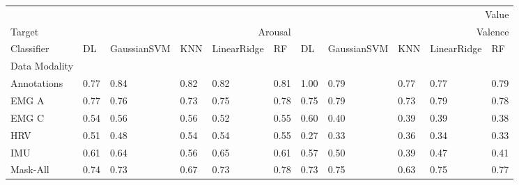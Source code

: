 \begin{tabular}{lllllllllll}
 & \multicolumn{10}{r}{Value} \\
Target & \multicolumn{5}{r}{Arousal} & \multicolumn{5}{r}{Valence} \\
Classifier & DL & GaussianSVM & KNN & LinearRidge & RF & DL & GaussianSVM & KNN & LinearRidge & RF \\
Data Modality &  &  &  &  &  &  &  &  &  &  \\
Annotations & 0.77 & 0.84 & 0.82 & 0.82 & 0.81 & 1.00 & 0.79 & 0.77 & 0.77 & 0.79 \\
EMG A & 0.77 & 0.76 & 0.73 & 0.75 & 0.78 & 0.75 & 0.79 & 0.73 & 0.79 & 0.78 \\
EMG C & 0.54 & 0.56 & 0.56 & 0.52 & 0.55 & 0.60 & 0.40 & 0.39 & 0.39 & 0.38 \\
HRV & 0.51 & 0.48 & 0.54 & 0.54 & 0.55 & 0.27 & 0.33 & 0.36 & 0.34 & 0.33 \\
IMU & 0.61 & 0.64 & 0.56 & 0.65 & 0.61 & 0.57 & 0.50 & 0.39 & 0.47 & 0.41 \\
Mask-All & 0.74 & 0.73 & 0.67 & 0.73 & 0.78 & 0.73 & 0.75 & 0.63 & 0.75 & 0.77 \\
\end{tabular}
